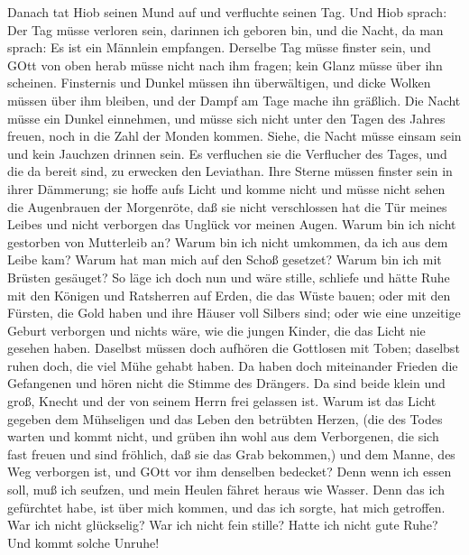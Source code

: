  Danach tat Hiob seinen Mund auf und verfluchte seinen Tag.
 Und Hiob sprach:  Der Tag müsse verloren sein,
darinnen ich geboren bin, und die Nacht, da man sprach: Es ist ein
Männlein empfangen.  Derselbe Tag müsse finster sein, und
GOtt von oben herab müsse nicht nach ihm fragen; kein Glanz müsse über
ihn scheinen.  Finsternis und Dunkel müssen ihn
überwältigen, und dicke Wolken müssen über ihm bleiben, und der Dampf am
Tage mache ihn gräßlich.  Die Nacht müsse ein Dunkel
einnehmen, und müsse sich nicht unter den Tagen des Jahres freuen, noch
in die Zahl der Monden kommen.  Siehe, die Nacht müsse
einsam sein und kein Jauchzen drinnen sein.  Es verfluchen
sie die Verflucher des Tages, und die da bereit sind, zu erwecken den
Leviathan.  Ihre Sterne müssen finster sein in ihrer
Dämmerung; sie hoffe aufs Licht und komme nicht und müsse nicht sehen
die Augenbrauen der Morgenröte,  daß sie nicht verschlossen
hat die Tür meines Leibes und nicht verborgen das Unglück vor meinen
Augen.  Warum bin ich nicht gestorben von Mutterleib an?
Warum bin ich nicht umkommen, da ich aus dem Leibe kam? 
Warum hat man mich auf den Schoß gesetzet? Warum bin ich mit Brüsten
gesäuget?  So läge ich doch nun und wäre stille, schliefe
und hätte Ruhe  mit den Königen und Ratsherren auf Erden,
die das Wüste bauen;  oder mit den Fürsten, die Gold haben
und ihre Häuser voll Silbers sind;  oder wie eine unzeitige
Geburt verborgen und nichts wäre, wie die jungen Kinder, die das Licht
nie gesehen haben.  Daselbst müssen doch aufhören die
Gottlosen mit Toben; daselbst ruhen doch, die viel Mühe gehabt haben.
 Da haben doch miteinander Frieden die Gefangenen und hören
nicht die Stimme des Drängers.  Da sind beide klein und
groß, Knecht und der von seinem Herrn frei gelassen ist. 
Warum ist das Licht gegeben dem Mühseligen und das Leben den betrübten
Herzen,  (die des Todes warten und kommt nicht, und grüben
ihn wohl aus dem Verborgenen,  die sich fast freuen und
sind fröhlich, daß sie das Grab bekommen,)  und dem Manne,
des Weg verborgen ist, und GOtt vor ihm denselben bedecket?
 Denn wenn ich essen soll, muß ich seufzen, und mein Heulen
fähret heraus wie Wasser.  Denn das ich gefürchtet habe,
ist über mich kommen, und das ich sorgte, hat mich getroffen.
 War ich nicht glückselig? War ich nicht fein stille? Hatte
ich nicht gute Ruhe? Und kommt solche Unruhe!

